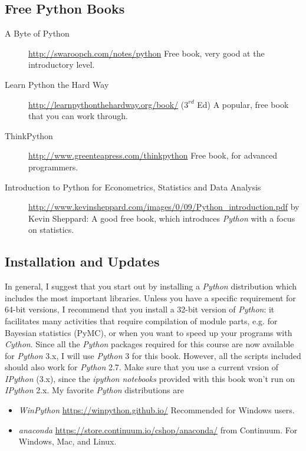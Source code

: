 \subsection{Free Python Books}

\begin{description}
  \item[A Byte of Python] \url{http://swaroopch.com/notes/python} Free book, very good at the introductory level.
  \item[Learn Python the Hard Way] \url{http://learnpythonthehardway.org/book/} ($3^{rd}$ Ed) A popular, free book that you can work through.
  \item[ThinkPython] \url{http://www.greenteapress.com/thinkpython} Free book, for advanced programmers.
  \item[Introduction to Python for Econometrics, Statistics and Data Analysis] \url{http://www.kevinsheppard.com/images/0/09/Python_introduction.pdf} by Kevin Sheppard: A
      good free book, which introduces \emph{Python} with a focus on statistics.
\end{description}

\subsection{Installation and Updates}

In general, I suggest that you start out by installing a \emph{Python} distribution which includes the most important libraries. Unless you have a specific requirement for 64-bit versions, I recommend that you install a 32-bit version of \emph{Python}: it facilitates many activities that require compilation of module parts, e.g. for Bayesian statistics (PyMC), or when you want to speed up your programs with \emph{Cython}. Since all the \emph{Python} packages required for this course are now available for \emph{Python} 3.x, I will use \emph{Python} 3 for this book. However, all the scripts included should also work for \emph{Python} 2.7. Make sure that you use a current vrsion of \emph{IPython} (3.x), since the \emph{ipython notebooks} provided with this book won't run on \emph{IPython} 2.x. My favorite \emph{Python} distributions  are
    
\begin{itemize}
    \item \emph{WinPython} \url{https://winpython.github.io/} Recommended for Windows users.
    \item \emph{anaconda} \url{https://store.continuum.io/cshop/anaconda/} from Continuum. For Windows, Mac, and Linux.
\end{itemize}

